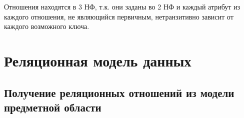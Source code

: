 \documentclass[10pt, a4paper, titlepage]{article}
\begin{document}
Отношения находятся в 3 НФ, т.к. они заданы во 2 НФ и каждый атрибут  из каждого отношения, не являющийся первичным, нетранзитивно зависит от каждого возможного ключа. 

\section{Реляционная модель данных}




\subsection{Получение реляционных отношений из модели предметной области}

{
    
    
    \newcommand{\pk}[1]{\textbf{#1}}
    
    \newcommand{\fk}[1]{\textit{#1}}
    
    \newcommand{\pfk}[1]{\pk{\fk{#1}}}
    
    \newcommand{\firstColumn}[4]{#1 - \newline #2 - \newline #3 \newline\newline #4}
    
    \newcommand{\thirdColumn}[6]{
    #1 \newline 
    \underline{Первичный ключ} - #2 \newline 
    \setbox0=\hbox{#3\unskip}\ifdim\wd0=0pt
    \else
      \underline{Внешний(е) ключ(-и)}: #3 \newline
    \fi
    #4 \newline 
    \underline{Первичный ключ} - #5 \newline
    \setbox0=\hbox{#6\unskip}\ifdim\wd0=0pt
    \else
      \underline{Внешний(е) ключ(-и)}: #6 \newline
    \fi
    }
    
    \newcommand\generalizedColumn[6]{\thirdColumn{#1:}{#2}{#3}{#4:}{#5}{#6}}
    
    
    
    \newcommand\ruleOneMondatoryOneMondatoryNum{1}
    \newcommand\ruleOneMondatoryOneMondatory{1 Об - 1 Об}
    
    \newcommand\ruleOneMondatoryOneOptionalNum{2}
    \newcommand\ruleOneMondatoryOneOptional{1 Об - 1 Н/О}
    \newcommand\ruleOneOptionalOneMondatoryNum{2}
    \newcommand\ruleOneOptionalOneMondatory{1 Н/О - 1 Об}
    
}
\end{document}
